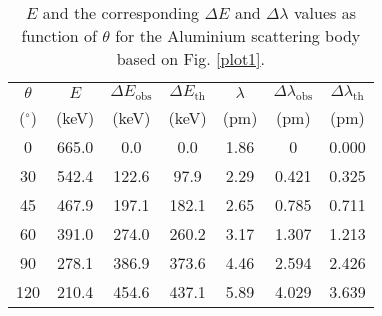 \begin{table}[H]
    \centering
    \begin{tabular}{|c|c|c|c|c|c|c|}
    \hline
    $\theta$ & $E$ & $\Delta E_\text{obs}$ & $\Delta E_\text{th}$ & $\lambda$ & $\Delta \lambda_\text{obs}$ & $\Delta \lambda_\text{th}$ \\
    ($^\circ$) & (keV) & (keV) & (keV) & (pm) & (pm) & (pm) \\ \hline
    0 & 665.0 & 0.0 & 0.0 & 1.86 & 0 & 0.000 \\ \hline
    30 & 542.4 & 122.6 & 97.9 & 2.29 & 0.421 & 0.325 \\ \hline
    45 & 467.9 & 197.1 & 182.1 & 2.65 & 0.785 & 0.711 \\ \hline
    60 & 391.0 & 274.0 & 260.2 & 3.17 & 1.307 & 1.213 \\ \hline
    90 & 278.1 & 386.9 & 373.6 & 4.46 & 2.594 & 2.426 \\ \hline
    120 & 210.4 & 454.6 & 437.1 & 5.89 & 4.029 & 3.639 \\ \hline
    \end{tabular}
    \caption{$E$ and the corresponding $\Delta E$ and $\Delta \lambda$ values as function of $\theta$ for the Aluminium scattering body based on Fig. \ref{plot1}.}
    \label{tab:1}
\end{table}